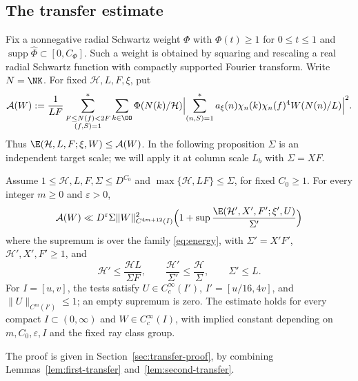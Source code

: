 \subsection{The transfer estimate}
Fix a nonnegative radial Schwartz weight $\Phi$ with
$\Phi(t)\ge1$ for $0\le t\le1$ and
$\operatorname{supp}\widehat\Phi\subset[0,C_\Phi]$.
Such a weight is obtained by squaring and rescaling a real radial
Schwartz function with compactly supported Fourier transform.
Write $N=\NK$. For fixed $\mathcal H,L,F,\xi$, put
\begin{equation}\label{eq:smoothed-energy}
 \mathcal A(W):=\frac1{LF}
 \sum_{\substack{F\le N(f)<2F\\(f,S)=1}}^*
 \sum_{k\in\OO}\Phi(N(k)/\mathcal H)
 \Bigl|\sum_{(n,S)=1}^*
 a_\xi(n)\chi_n(k)\chi_n(f)^4W(N(n)/L)\Bigr|^2.
\end{equation}
Thus $\E(\mathcal H,L,F;\xi,W)\le\mathcal A(W)$.
In the following proposition $\Sigma$ is an independent target scale;
we will apply it at column scale $L_b$ with $\Sigma=XF$.

\begin{proposition}\label{prop:transfer}
Assume $1\le\mathcal H,L,F,\Sigma\le D^{C_0}$ and
$\max\{\mathcal H,LF\}\le\Sigma$, for fixed $C_0\ge1$.
For every integer $m\ge0$ and $\varepsilon>0$,
\begin{equation}\label{eq:transfer-summary}
 \mathcal A(W)\ll D^\varepsilon\Sigma\|W\|_{C^{4m+12}(I)}^2
 \Bigl(1+\sup\frac{\E(\mathcal H',X',F';\xi',U)}{\Sigma'}\Bigr)
\end{equation}
where the supremum is over the family \eqref{eq:energy}, with
$\Sigma'=X'F'$, $\mathcal H',X',F'\ge1$, and
\begin{equation}\label{eq:transfer-scales}
 \mathcal H'\le\frac{\mathcal HL}{\Sigma F},\qquad
 \frac{\mathcal H'}{\Sigma'}\le
 \frac{\mathcal H}{\Sigma},\qquad
 \Sigma'\le L.
\end{equation}
For $I=[u,v]$, the tests satisfy
$U\in C_c^\infty(I')$, $I'=[u/16,4v]$, and
$\|U\|_{C^m(I')}\le1$; an empty supremum is zero.
The estimate holds for every compact $I\subset(0,\infty)$ and
$W\in C_c^\infty(I)$, with implied constant depending on
$m,C_0,\varepsilon,I$ and the fixed ray class group.
\end{proposition}

The proof is given in Section~\ref{sec:transfer-proof}, by combining
Lemmas~\ref{lem:first-transfer} and~\ref{lem:second-transfer}.

